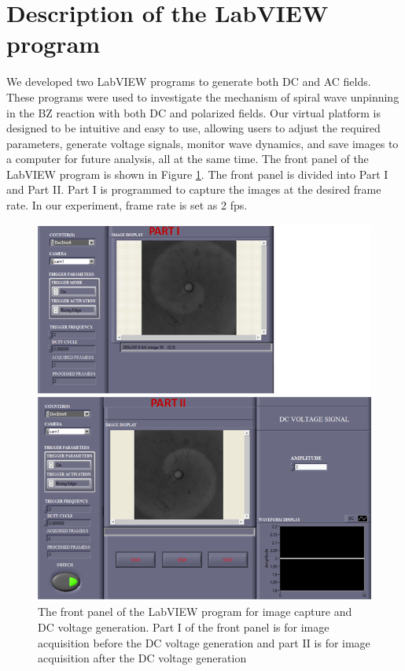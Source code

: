\documentclass[journal=jacsat,manuscript=article]{achemso}
\begin{document}
\section{Description of the LabVIEW program}
We developed two LabVIEW programs to generate both DC and AC
fields. These programs were used to investigate the mechanism of
spiral wave unpinning in the BZ reaction with both DC and polarized
fields.  Our virtual platform is designed to be
intuitive and easy to use, allowing users to adjust the required
parameters, generate voltage signals, monitor wave dynamics, and save
images to a computer for future analysis, all at the same time.
The front panel of the LabVIEW program is shown in Figure
\ref{fig:ex3}. The front panel is
divided into Part I and Part II. Part I is programmed to capture the
images at the desired frame rate.
In our experiment, frame rate is set as 2 fps. 
\begin{figure}[H]
    \centering
\includegraphics[width=\linewidth]{Dc_frntpnl.png}
    \caption{The front panel of the LabVIEW program for image capture
      and DC voltage generation. Part I of the front panel is for
      image acquisition before the DC voltage generation and part II
      is for image acquisition after the DC voltage generation}
    \label{fig:ex3}
\end{figure}
\end{document}
